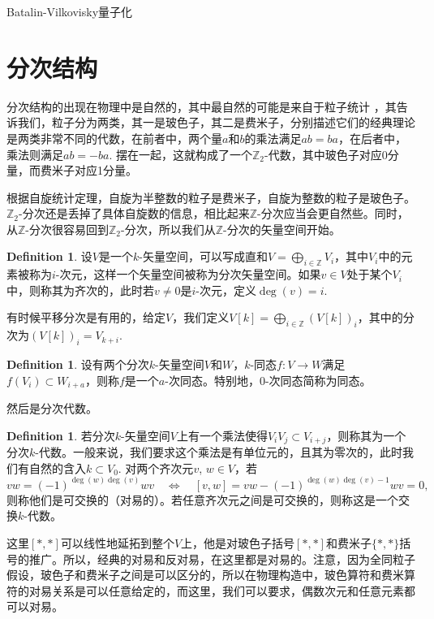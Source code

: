 \documentclass[11pt]{article}
\theoremstyle{definition}
\newtheorem{defi}[para]{Definition}
\theoremstyle{plain}
\begin{document}
Batalin-Vilkovisky量子化

\section{分次结构}

分次结构的出现在物理中是自然的，其中最自然的可能是来自于粒子统计%
，其告诉我们，粒子分为两类，其一是玻色子，其二是费米子，分别描述它们的经典理论是两类非常不同的代数，在前者中，两个量$a$和$b$的乘法满足$ab=ba$，在后者中，乘法则满足$ab=-ba$. 摆在一起，这就构成了一个$\mathbb Z_2$-代数，其中玻色子对应0分量，而费米子对应1分量。

根据自旋统计定理，自旋为半整数的粒子是费米子，自旋为整数的粒子是玻色子。$\mathbb{Z}_2$-分次还是丢掉了具体自旋数的信息，相比起来$\mathbb{Z}$-分次应当会更自然些。同时，从$\mathbb Z$-分次很容易回到$\mathbb Z_2$-分次，所以我们从$\mathbb{Z}$-分次的矢量空间开始。

\begin{defi}
    设$V$是一个$k$-矢量空间，可以写成直和$V=\bigoplus_{i\in\mathbb Z} V_i$，其中$V_i$中的元素被称为$i$-次元，这样一个矢量空间被称为分次矢量空间。如果$v\in V$处于某个$V_i$中，则称其为齐次的，此时若$v\neq 0$是$i$-次元，定义$\deg(v)=i$. 
\end{defi}

有时候平移分次是有用的，给定$V$，我们定义$V[k]=\bigoplus_{i\in\mathbb Z} (V[k])_i$，其中的分次为$(V[k])_i=V_{k+i}$. 

\begin{defi}
    设有两个分次$k$-矢量空间$V$和$W$，$k$-同态$f:V\to W$满足$f(V_i)\subset W_{i+a}$，则称$f$是一个$a$-次同态。特别地，$0$-次同态简称为同态。
\end{defi}

然后是分次代数。

\begin{defi}
    若分次$k$-矢量空间$V$上有一个乘法使得$V_iV_j\subset V_{i+j}$，则称其为一个分次$k$-代数。一般来说，我们要求这个乘法是有单位元的，且其为零次的，此时我们有自然的含入$k\subset V_0$. 对两个齐次元$v$, $w\in V$，若
\[
    vw=(-1)^{\deg(w)\deg(v)}wv\quad \Leftrightarrow \quad 
    [v,w]=vw-(-1)^{\deg(w)\deg(v)-1}wv=0,
\]
则称他们是可交换的（对易的）。若任意齐次元之间是可交换的，则称这是一个交换$k$-代数。
\end{defi}

这里$[*,*]$可以线性地延拓到整个$V$上，他是对玻色子括号$[*,*]$和费米子$\{*,*\}$括号的推广。所以，经典的对易和反对易，在这里都是对易的。注意，因为全同粒子假设，玻色子和费米子之间是可以区分的，所以在物理构造中，玻色算符和费米算符的对易关系是可以任意给定的，而这里，我们可以要求，偶数次元和任意元素都可以对易。
\end{document}
